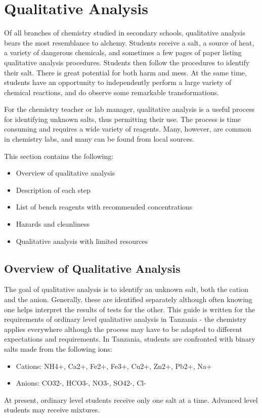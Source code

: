 \chapter{Qualitative Analysis}

Of all branches of chemistry studied in secondary schools, 
qualitative analysis bears the most resemblance to alchemy. 
Students receive a salt, 
a source of heat, 
a variety of dangerous chemicals, 
and sometimes a few pages of paper listing 
qualitative analysis procedures. 
Students then follow the procedures to identify their salt. 
There is great potential for both harm and mess. 
At the same time, 
students have an opportunity to independently perform 
a large variety of chemical reactions, 
and do observe some remarkable transformations.

For the chemistry teacher or lab manager, 
qualitative analysis is a useful process for identifying unknown salts, 
thus permitting their use. 
The process is time consuming and requires a wide variety of reagents. 
Many, 
however, 
are common in chemistry labs, 
and many can be found from local sources.

This section contains the following:
\begin{itemize}
\item{Overview of qualitative analysis}
\item{Description of each step}
\item{List of bench reagents with recommended concentrations}
\item{Hazards and cleanliness}
\item{Qualitative analysis with limited resources}
\end{itemize}

\section{Overview of Qualitative Analysis}
The goal of qualitative analysis is to identify an unknown salt, 
both the cation and the anion. 
Generally, 
these are identified separately 
although often knowing one helps interpret 
the results of tests for the other. 
This guide is written for the requirements of 
ordinary level qualitative analysis in Tanzania - 
the chemistry applies everywhere 
although the process may have to be adapted 
to different expectations and requirements. 
In Tanzania, 
students are confronted with binary salts made from the following ions:
\begin{itemize}
\item{Cations: NH4+, 
Ca2+, 
Fe2+, 
Fe3+, 
Cu2+, 
Zn2+, 
Pb2+, 
Na+}
\item{Anions: CO32-, 
HCO3-, 
NO3-, 
SO42-, 
Cl-}
\end{itemize}
At present, 
ordinary level students receive only one salt at a time. 
Advanced level students may receive mixtures.

